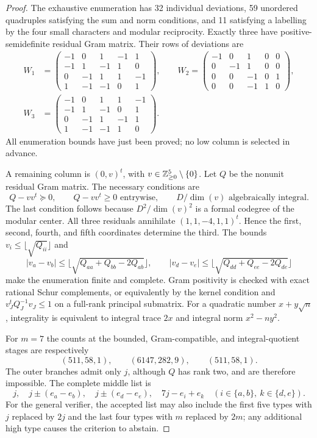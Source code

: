 \begin{proof}
The exhaustive enumeration has 32 individual deviations, 59 unordered
quadruples satisfying the sum and norm conditions, and 11 satisfying a
labelling by the four small characters and modular reciprocity.
Exactly three have positive-semidefinite residual Gram matrix.  Their
rows of deviations are
\[
\begin{split}
W_1&=\begin{pmatrix}-1&0&1&-1&1\\-1&1&-1&1&0\\0&-1&1&1&-1\\1&-1&-1&0&1\end{pmatrix},\qquad
W_2=\begin{pmatrix}-1&0&1&0&0\\0&-1&1&0&0\\0&0&-1&0&1\\0&0&-1&1&0\end{pmatrix},\\
W_3&=\begin{pmatrix}-1&0&1&1&-1\\-1&1&-1&0&1\\0&-1&1&-1&1\\1&-1&-1&1&0\end{pmatrix}.
\end{split}
\]
All enumeration bounds have just been proved; no low column is selected
in advance.

A remaining column is $(0,v)^t$, with $v\in\mathbb Z_{\ge0}^5\setminus\{0\}$.
Let $Q$ be the nonunit residual Gram matrix.  The necessary conditions are
\[
 Q-vv^t\succeq0,\qquad Q-vv^t\ge0\text{ entrywise},\qquad
 D/\dim(v)\text{ algebraically integral}.
\]
The last condition follows because $D^2/\dim(v)^2$ is a formal codegree
of the modular center.  All three residuals annihilate
$(1,1,-4,1,1)^t$.  Hence the first, second, fourth, and fifth coordinates
determine the third.  The bounds $v_i\le\lfloor\sqrt{Q_{ii}}\rfloor$ and
\[
 |v_a-v_b|\le\lfloor\sqrt{Q_{aa}+Q_{bb}-2Q_{ab}}\rfloor,
 \qquad
 |v_d-v_e|\le\lfloor\sqrt{Q_{dd}+Q_{ee}-2Q_{de}}\rfloor
\]
make the enumeration finite and complete.  Gram positivity is checked
with exact rational Schur complements, or equivalently by the kernel
condition and $v_J^tQ_J^{-1}v_J\le1$ on a full-rank principal submatrix.
For a quadratic number $x+y\sqrt n$, integrality is equivalent to integral
trace $2x$ and integral norm $x^2-ny^2$.

For $m=7$ the counts at the bounded, Gram-compatible, and integral-quotient
stages are respectively
\[
 (511,58,1),\qquad (6147,282,9),\qquad (511,58,1).
\]
The outer branches admit only $j$, although $Q$ has rank two, and are
therefore impossible.  The complete middle list is
\[
 j,\quad j\pm(e_a-e_b),\quad j\pm(e_d-e_e),\quad
 7j-e_i+e_k\quad(i\in\{a,b\},\ k\in\{d,e\}).
\]
For the general verifier, the accepted list may also include the first
five types with $j$ replaced by $2j$ and the last four types with $m$
replaced by $2m$; any additional high type causes the criterion to abstain.


\end{proof}

